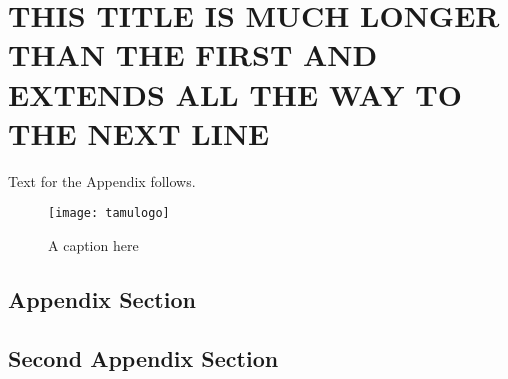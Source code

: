 %
%	 
%


\chapter{THIS TITLE IS MUCH LONGER THAN THE FIRST AND EXTENDS ALL THE WAY TO THE NEXT LINE}

Text for the Appendix follows.

\begin{figure}[ht]
    \centering
    \texttt{[image: tamulogo]}
    \caption{A caption here}
\end{figure}

\section{Appendix Section}

\section{Second Appendix Section}


\pagebreak{}
